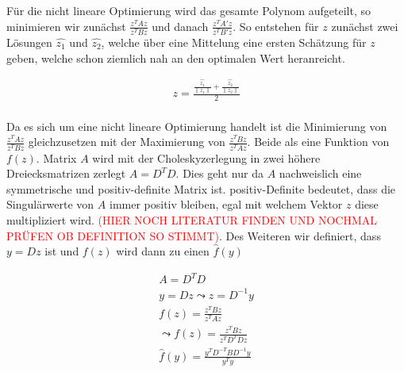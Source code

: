 Für die nicht lineare Optimierung wird das gesamte Polynom aufgeteilt, so minimieren wir zunächst $\frac{z^TAz}{z^TBz}$ und danach $\frac{z^TA'z}{z^TB'z}$. So entstehen für $z$ zunächst zwei Lösungen 
$\hat{z_1}$ und $\hat{z_2}$, welche über eine Mittelung eine ersten Schätzung für $z$ geben, welche schon ziemlich nah an den optimalen Wert heranreicht.

\begin{gather}
	z = \frac{\frac{\hat{z_1}}{\| z_1 \|}+\frac{\hat{z_2}}{\| z_2 \|}}{2}
\end{gather}\\

Da es sich um eine nicht lineare Optimierung handelt ist die Minimierung von  $\frac{z^TAz}{z^TBz}$ gleichzusetzen mit der Maximierung von  $\frac{z^TBz}{z^TAz}$. Beide als eine Funktion von $f(z)$. Matrix $A$ wird mit der Choleskyzerlegung in zwei höhere Dreiecksmatrizen zerlegt $A = D^TD$\cite{Fortran77}. Dies geht nur da $A$ nachweislich eine symmetrische und positiv-definite Matrix ist.\cite{Fortran77} positiv-Definite bedeutet, dass die Singulärwerte von $A$ immer positiv bleiben, egal mit welchem Vektor $z$ diese multipliziert wird. \textcolor{red}{(HIER NOCH LITERATUR FINDEN UND NOCHMAL PRÜFEN OB DEFINITION SO STIMMT)}.  Des Weiteren wir definiert, dass $y = Dz$ ist und $f(z)$ wird dann zu einen $\hat{f}(y)$

\begin{gather}
	A = D^TD\\
	y= Dz \leadsto z= D^{-1}y\\
	f(z)= \frac{z^TBz}{z^TAz}\\
	\leadsto 
	f(z)=\frac{z^TBz}{z^TD^TDz}\\
	\hat{f}(y)= \frac{y^TD^{-T}BD^{-1}y}{y^Ty}
\end{gather}

